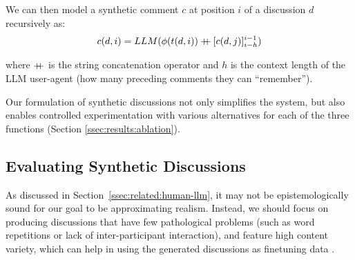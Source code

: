 We can then model a synthetic comment $c$ at position $i$ of a discussion $d$ recursively as:
\begin{equation}
\label{eq:comment}
    c(d, i) = LLM(\phi(t(d, i)) \mathbin{{+}\mspace{-8mu}{+}} [c(d, j)]^{i-1}_{i-h})
\end{equation}

\noindent where $\mathbin{{+}\mspace{-8mu}{+}}$ is the string concatenation operator and $h$ is the context length of the \ac{LLM} user-agent (how many preceding comments they can “remember”).

Our formulation of synthetic discussions not only simplifies the system, but also enables controlled experimentation with various alternatives for each of the three functions (Section \ref{ssec:results:ablation}).






\subsection{Evaluating Synthetic Discussions}
\label{ssec:methodology:diversity}

As discussed in Section~\ref{ssec:related:human-llm}, it may not be epistemologically sound for our goal to be approximating realism. Instead, we should focus on producing discussions that have few pathological problems (such as word repetitions or lack of inter-participant interaction), and feature high content variety, which can help in using the generated discussions as finetuning data \cite{ulmer2024}. 

